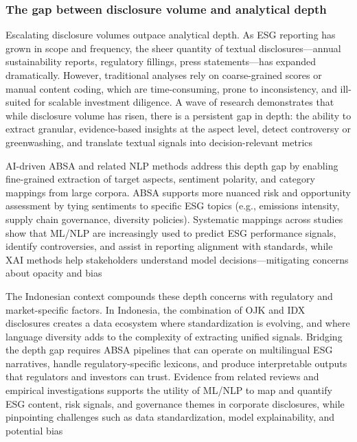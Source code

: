 \subsubsection{The gap between disclosure volume and analytical depth}
Escalating disclosure volumes outpace analytical depth. As ESG reporting has grown in scope and frequency, the sheer quantity of textual disclosures—annual sustainability reports, regulatory fillings, press statements—has expanded dramatically. However, traditional analyses rely on coarse-grained scores or manual content coding, which are time-consuming, prone to inconsistency, and ill-suited for scalable investment diligence. A wave of research demonstrates that while disclosure volume has risen, there is a persistent gap in depth: the ability to extract granular, evidence-based insights at the aspect level, detect controversy or greenwashing, and translate textual signals into decision-relevant metrics \cite{10.1002/csr.70089,10.1111/eufm.12509,10.2139/ssrn.3738629,10.1108/mf-01-2023-0020}

AI-driven ABSA and related NLP methods address this depth gap by enabling fine-grained extraction of target aspects, sentiment polarity, and category mappings from large corpora. ABSA supports more nuanced risk and opportunity assessment by tying sentiments to specific ESG topics (e.g., emissions intensity, supply chain governance, diversity policies). Systematic mappings across studies show that ML/NLP are increasingly used to predict ESG performance signals, identify controversies, and assist in reporting alignment with standards, while XAI methods help stakeholders understand model decisions—mitigating concerns about opacity and bias \cite{10.1002/csr.70089,10.2139/ssrn.3738629,10.1108/mf-01-2023-0020}

The Indonesian context compounds these depth concerns with regulatory and market-specific factors. In Indonesia, the combination of OJK and IDX disclosures creates a data ecosystem where standardization is evolving, and where language diversity adds to the complexity of extracting unified signals. Bridging the depth gap requires ABSA pipelines that can operate on multilingual ESG narratives, handle regulatory-specific lexicons, and produce interpretable outputs that regulators and investors can trust. Evidence from related reviews and empirical investigations supports the utility of ML/NLP to map and quantify ESG content, risk signals, and governance themes in corporate disclosures, while pinpointing challenges such as data standardization, model explainability, and potential bias \cite{10.69593/ajbais.v4i04.130,10.2139/ssrn.3738629,10.1108/mf-01-2023-0020}

